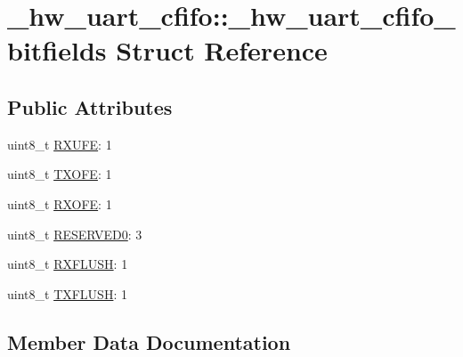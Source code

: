 \hypertarget{struct__hw__uart__cfifo_1_1__hw__uart__cfifo__bitfields}{}\section{\+\_\+hw\+\_\+uart\+\_\+cfifo\+:\+:\+\_\+hw\+\_\+uart\+\_\+cfifo\+\_\+bitfields Struct Reference}
\label{struct__hw__uart__cfifo_1_1__hw__uart__cfifo__bitfields}
\subsection*{Public Attributes}
\begin{DoxyCompactItemize}
\item 
uint8\+\_\+t \hyperlink{struct__hw__uart__cfifo_1_1__hw__uart__cfifo__bitfields_a6ab2f75a13d9e7297030f9c95c2aa338}{R\+X\+U\+FE}\+: 1
\item 
uint8\+\_\+t \hyperlink{struct__hw__uart__cfifo_1_1__hw__uart__cfifo__bitfields_a4a3a9941bc784044b5a6f4fbac8915de}{T\+X\+O\+FE}\+: 1
\item 
uint8\+\_\+t \hyperlink{struct__hw__uart__cfifo_1_1__hw__uart__cfifo__bitfields_acd9591bba85d7ce3e94062c7f15c833e}{R\+X\+O\+FE}\+: 1
\item 
uint8\+\_\+t \hyperlink{struct__hw__uart__cfifo_1_1__hw__uart__cfifo__bitfields_a11b9a2fcbbd0a8facbf56436ab39e0a1}{R\+E\+S\+E\+R\+V\+E\+D0}\+: 3
\item 
uint8\+\_\+t \hyperlink{struct__hw__uart__cfifo_1_1__hw__uart__cfifo__bitfields_a0e5f89092c39133e5b4951b477fb10bc}{R\+X\+F\+L\+U\+SH}\+: 1
\item 
uint8\+\_\+t \hyperlink{struct__hw__uart__cfifo_1_1__hw__uart__cfifo__bitfields_a9e0a36b78566a7d178bd58e6c256df4d}{T\+X\+F\+L\+U\+SH}\+: 1
\end{DoxyCompactItemize}


\subsection{Member Data Documentation}
